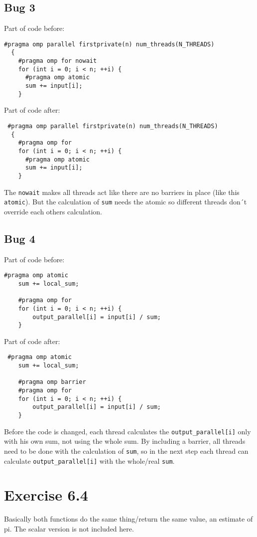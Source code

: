 \documentclass[a4paper]{article}
\begin{document}
\subsection*{Bug 3}
Part of code before: 
\begin{lstlisting}
#pragma omp parallel firstprivate(n) num_threads(N_THREADS)
  {
    #pragma omp for nowait
    for (int i = 0; i < n; ++i) {
      #pragma omp atomic
      sum += input[i];
    }
\end{lstlisting}
Part of code after:
\begin{lstlisting}
 #pragma omp parallel firstprivate(n) num_threads(N_THREADS)
  {
    #pragma omp for 
    for (int i = 0; i < n; ++i) {
      #pragma omp atomic
      sum += input[i];    
    }
\end{lstlisting}
The  \lstinline{nowait} makes all threads act like there are no barriers in place (like this \lstinline{atomic}). But the calculation of \lstinline{sum} needs the atomic so different threads don´t override each others calculation.

\subsection*{Bug 4}
Part of code before: 
\begin{lstlisting}
#pragma omp atomic
    sum += local_sum;

    #pragma omp for
    for (int i = 0; i < n; ++i) {
        output_parallel[i] = input[i] / sum;
    }
\end{lstlisting}
Part of code after:
\begin{lstlisting}
 #pragma omp atomic
    sum += local_sum;

    #pragma omp barrier 
    #pragma omp for
    for (int i = 0; i < n; ++i) {
        output_parallel[i] = input[i] / sum;
    }
\end{lstlisting}
Before the code is changed, each thread calculates the \lstinline{output_parallel[i]} only with his own sum, not using the whole sum.
By including a barrier, all threads need to be done with the calculation of \lstinline{sum}, so in the next step each thread can calculate \lstinline{output_parallel[i]} with the whole/real \lstinline{sum}.

\section*{Exercise 6.4}
Basically both functions do the same thing/return the same value, an estimate of pi. The scalar version is not included here.
\end{document}
